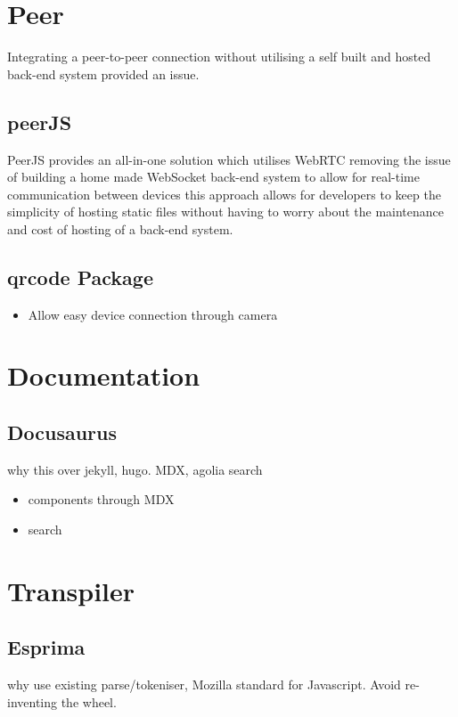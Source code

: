 \documentclass{l4proj}
\begin{document}
\section{Peer }

Integrating a peer-to-peer connection without utilising a self built and hosted back-end system provided an issue.

\subsection{peerJS}
\text PeerJS provides an all-in-one solution which utilises WebRTC removing the issue of building a home made WebSocket back-end system to allow for real-time communication between devices this approach allows for developers to keep the simplicity of hosting static files without having to worry about the maintenance and cost of hosting of a back-end system.

\subsection{qrcode Package }
\begin{itemize}
    \item Allow easy device connection through camera
\end{itemize}

\section{Documentation }

\subsection{Docusaurus }
\text why this over jekyll, hugo. MDX, agolia search
\begin{itemize}
    \item components through MDX
    \item search
\end{itemize}

\section{Transpiler }

\subsection{Esprima }
\text why use existing parse/tokeniser, Mozilla standard for Javascript. Avoid re-inventing the wheel.
\end{document}

